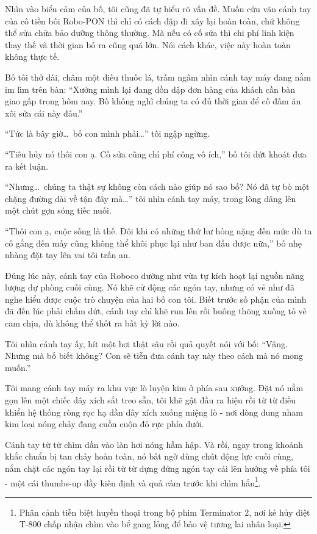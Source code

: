 \documentclass[../main.tex]{subfiles}
\begin{document}
\ct

Nhìn vào biểu cảm của bố, tôi cũng đã tự hiểu rõ vấn đề. Muốn cứu vãn cánh tay của cô tiền bối Robo-PON thì chỉ có cách đập đi xây lại hoàn toàn, chứ không thể sửa chữa bảo dưỡng thông thường. Mà nếu có cố sửa thì chi phí linh kiện thay thế và thời gian bỏ ra cũng quá lớn. Nói cách khác, việc này hoàn toàn không thực tế.

Bố tôi thở dài, châm một điếu thuốc lá, trầm ngâm nhìn cánh tay máy đang nằm im lìm trên bàn: ``Xưởng mình lại đang dồn dập đơn hàng của khách cần bàn giao gấp trong hôm nay. Bố không nghĩ chúng ta có đủ thời gian để cố đấm ăn xôi sửa cái này đâu.''

``Tức là bây giờ\dots\ bố con mình phải\dots'' tôi ngập ngừng.

``Tiêu hủy nó thôi con ạ. Cố sửa cũng chỉ phí công vô ích,'' bố tôi dứt khoát đưa ra kết luận.

``Nhưng\dots\ chúng ta thật sự không còn cách nào giúp nó sao bố? Nó đã tự bò một chặng đường dài về tận đây mà\dots'' tôi nhìn cánh tay máy, trong lòng dâng lên một chút gợn sóng tiếc nuối.

``Thôi con ạ, cuộc sống là thế. Đôi khi có những thứ hư hỏng nặng đến mức dù ta cố gắng đến mấy cũng không thể khôi phục lại như ban đầu được nữa,'' bố nhẹ nhàng đặt tay lên vai tôi trấn an.

Đúng lúc này, cánh tay của Roboco dường như vừa tự kích hoạt lại nguồn năng lượng dự phòng cuối cùng. Nó khẽ cử động các ngón tay, nhưng có vẻ như đã nghe hiểu được cuộc trò chuyện của hai bố con tôi. Biết trước số phận của mình đã đến lúc phải chấm dứt, cánh tay chỉ khẽ run lên rồi buông thõng xuống tỏ vẻ cam chịu, dù không thể thốt ra bất kỳ lời nào.

Tôi nhìn cánh tay ấy, hít một hơi thật sâu rồi quả quyết nói với bố: ``Vâng. Nhưng mà bố biết không? Con sẽ tiễn đưa cánh tay này theo cách mà nó mong muốn.''

\ct

Tôi mang cánh tay máy ra khu vực lò luyện kim ở phía sau xưởng. Đặt nó nằm gọn lên một chiếc dây xích sắt treo sẵn, tôi khẽ gật đầu ra hiệu rồi từ từ điều khiển hệ thống ròng rọc hạ dần dây xích xuống miệng lò - nơi dòng dung nham kim loại nóng chảy đang cuồn cuộn đỏ rực phía dưới.

Cánh tay từ từ chìm dần vào làn hơi nóng hầm hập. Và rồi, ngay trong khoảnh khắc chuẩn bị tan chảy hoàn toàn, nó bất ngờ dùng chút động lực cuối cùng, nắm chặt các ngón tay lại rồi từ từ dựng đứng ngón tay cái lên hướng về phía tôi - một cái thumbs-up đầy kiên định và quả cảm trước khi chìm hẳn\footnote{Phân cảnh tiễn biệt huyền thoại trong bộ phim Terminator 2, nơi kẻ hủy diệt T-800 chấp nhận chìm vào bể gang lỏng để bảo vệ tương lai nhân loại.}.
\end{document}
